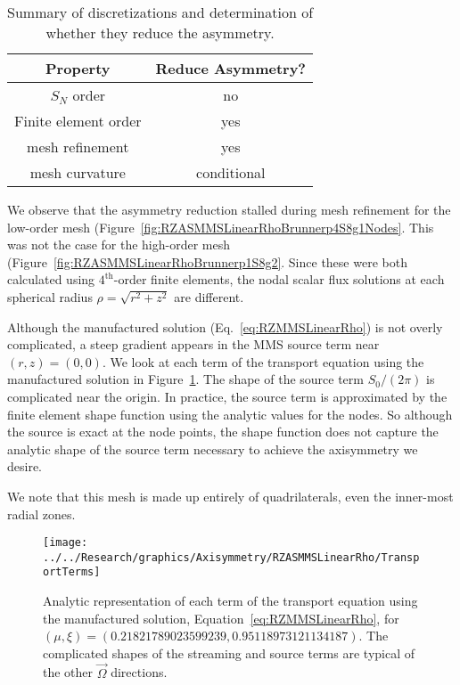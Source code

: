 \documentclass[12pt]{article}
\begin{document}
\begin{table}[!htb]
\begin{tabular}{|c|c|}
\hline
Property & Reduce Asymmetry? \\\hline
$S_N$ order & no \\\hline
Finite element order & yes \\\hline
mesh refinement & yes \\\hline
mesh curvature & conditional \\\hline
\end{tabular}
\caption{Summary of discretizations and determination of whether they reduce the asymmetry.}
\label{tab:AxisymmetrySummary}
\end{table}

We observe that the asymmetry reduction stalled during mesh refinement for the low-order mesh (Figure~\ref{fig:RZASMMSLinearRhoBrunnerp4S8g1Nodes}. This was not the case for the high-order mesh (Figure~\ref{fig:RZASMMSLinearRhoBrunnerp1S8g2}. Since these were both calculated using $4^\text{th}$-order finite elements, the nodal scalar flux solutions at each spherical radius $\rho=\sqrt{r^2+z^2}$ are different.


Although the manufactured solution (Eq.~\ref{eq:RZMMSLinearRho}) is not overly complicated, a steep gradient appears in the MMS source term near $(r,z)=(0,0)$. We look at each term of the transport equation using the manufactured solution in Figure~\ref{fig:RZMMSLinearRhoAnalytic}. The shape of the source term $S_0/(2 \pi)$ is complicated near the origin. In practice, the source term is approximated by the finite element shape function using the analytic values for the nodes. So although the source is exact at the node points, the shape function does not capture the analytic shape of the source term necessary to achieve the axisymmetry we desire.

We note that this mesh is made up entirely of quadrilaterals, even the inner-most radial zones.

\begin{figure}
\texttt{[image: ../../Research/graphics/Axisymmetry/RZASMMSLinearRho/TransportTerms]}
\caption{Analytic representation of each term of the transport equation using the manufactured solution, Equation~\ref{eq:RZMMSLinearRho}, for $(\mu,\xi)=(0.21821789023599239,0.95118973121134187)$. The complicated shapes of the streaming and source terms are typical of the other $\vec{\Omega}$ directions.}
\label{fig:RZMMSLinearRhoAnalytic}
\end{figure}
\end{document}
